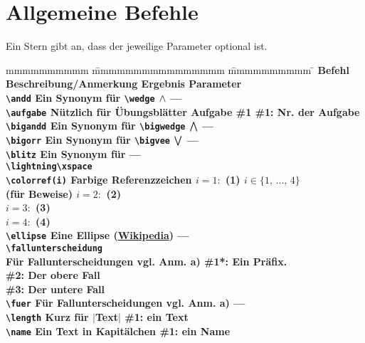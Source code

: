 		\section{Allgemeine Befehle}
			Ein Stern gibt an, dass der jeweilige Parameter optional ist. 
			\begin{tabbing}
				mmmmmmmmmm			\= mmmmmmmmmmmmmmmm							\= mmmmmmmmmm			\= \kill
				\bf Befehl			\> \bf Beschreibung/Anmerkung				\> \bf Ergebnis 		\> \bf Parameter 				\\
				\verb|\andd|		\> Ein Synonym für \verb|\wedge|			\> $\wedge$ 				\> ---							\\
				\verb|\aufgabe|		\> Nützlich für Übungsblätter				\> Aufgabe \#1 			\> \#1: Nr. der Aufgabe 		\\
				\verb|\bigandd|		\> Ein Synonym für \verb|\bigwedge|			\> $\bigwedge$ 			\> --- 							\\
				\verb|\bigorr|		\> Ein Synonym für \verb|\bigvee|			\> $\bigvee$ 			\> --- 							\\
				\verb|\blitz|		\> Ein Synonym für							\> \lightning\xspace 	\> ---							\\
									\> \verb|\lightning\xspace|																			\\
				\verb|\colorref(i)|	\> Farbige Referenzzeichen					\> $i=1:$ (1)	\> $i \in \{1, \, \ldots, \, 4\}$	\\
									\>(\zb für Beweise)							\> $i=2:$ \colorref(2)										\\
									\>											\> $i=3:$ (3)										\\
									\>											\> $i=4:$ (4)										\\
				\verb|\ellipse|		\> Eine Ellipse	 (\href{https://de.wikipedia.org/wiki/Auslassungspunkte}{Wikipedia})
									\> \ellipse				\> ---							\\
				\verb|\fallunterscheidung|\\
									\> Für Fallunterscheidungen					\> vgl. Anm. a)			\> \#1*: Ein Präfix.			\\
									\>											\>						\> \#2: Der obere Fall			\\
									\>											\>						\> \#3: Der untere Fall			\\
				\verb|\fuer|		\> Für Fallunterscheidungen					\> vgl. Anm. a)			\> ---							\\
				\verb|\length|		\> Kurz für $|$Text$|$						\> \length{Text}		\> \#1: ein Text				\\
				\verb|\name|		\> Ein Text in Kapitälchen					\> \name{Der Autor}		\> \#1: ein Name				\\

\end{tabbing}
